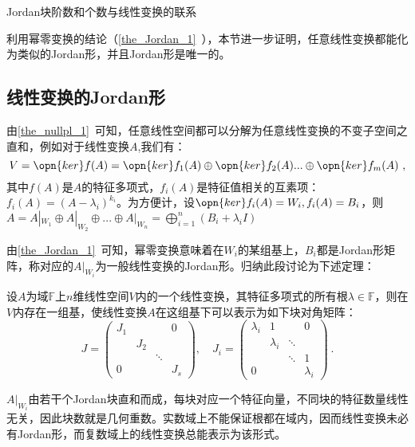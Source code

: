 

\begin{issues}
\issueDraft
\issueTODO Jordan块阶数和个数与线性变换的联系
\end{issues}
利用幂零变换的结论（\autoref{the_Jordan_1}~），本节进一步证明，任意线性变换都能化为类似的Jordan形，并且Jordan形是唯一的。
\subsection{线性变换的Jordan形}
由\autoref{the_nullpl_1}~可知，任意线性空间都可以分解为任意线性变换的不变子空间之直和，例如对于线性变换$A$,我们有：
\begin{equation}
V=\opn{ker}f(A)=\opn{ker}f_1(A)\oplus\opn{ker}f_2(A)...\oplus\opn{ker}f_m(A)~,
\end{equation}
其中$f(A)$是$A$的特征多项式，$f_i(A)$是特征值相关的互素项：$f_i(A)=(A-\lambda_i)^{k_i}$。为方便计，设$\opn{ker}f_i(A)=W_i,f_i(A)=B_i$，则$A=A|_{W_1}\oplus A|_{W_2}\oplus...\oplus A|_{W_n}=\bigoplus^n_{i=1}(B_i+\lambda_iI)$

由\autoref{the_Jordan_1}~可知，幂零变换意味着在$W_i$的某组基上，$B_i$都是Jordan形矩阵，称对应的$A|_{W_i}$为一般线性变换的Jordan形。归纳此段讨论为下述定理：
\begin{theorem}{}
设$A$为域$\mathbb F$上$n$维线性空间$V$内的一个线性变换，其特征多项式的所有根$\lambda\in\mathbb F$，则在$V$内存在一组基，使线性变换$A$在这组基下可以表示为如下块对角矩阵：
\begin{equation}
J=\left(\begin{array}{cccc}
J_1 & & & 0 \\
& J_2 & & \\
& & \ddots & \\
0 & & & J_s
\end{array}\right), \quad J_i=\left(\begin{array}{cccc}
\lambda_i & 1 & & 0 \\
& \lambda_i & \ddots & \\
& & \ddots & 1 \\
0 & & & \lambda_i
\end{array}\right)~.
\end{equation}
\end{theorem}
$A|_{W_i}$由若干个Jordan块直和而成，每块对应一个特征向量，不同块的特征数量线性无关，因此块数就是几何重数。实数域上不能保证根都在域内，因而线性变换未必有Jordan形，而复数域上的线性变换总能表示为该形式。
